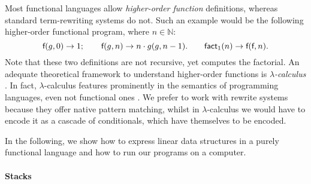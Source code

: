 Most functional languages allow \emph{higher-order
  function}
definitions, whereas standard term\hyp{}rewriting systems do not. Such
an example would be the following higher\hyp{}order functional
program, where \(n \in \mathbb{N}\):
\begin{equation*}
\textsf{f}(g,0) \rightarrow 1;
\qquad
\textsf{f}(g,n) \rightarrow n \cdot g(g,n-1).
\qquad
\textsf{fact}_1(n) \rightarrow \textsf{f}(\textsf{f},n).
\end{equation*}
Note that these two definitions are not recursive, yet
 computes the
factorial. An adequate theoretical
framework to understand higher\hyp{}order functions is
\emph{\(\lambda\)-calculus}\hspace*{-2.1pt}
\citep{HindleySeldin_2008,VanLeeuwen_1990b}.
 In fact,
\(\lambda\)-calculus features prominently in the semantics of
programming languages, even not functional ones
\citep{Winskel_1993,Reynolds_1998,Pierce_2002,FriedmanWand_2008,TurbakGifford_2008}. We
prefer to work with rewrite systems because they offer native pattern
matching, whilst in
\(\lambda\)-calculus we
would have to encode it as a cascade of conditionals, which have
themselves to be encoded.

In the following, we show how to express linear data structures in a
purely functional language and how to run our programs on a computer.

\paragraph{Stacks}
\label{par:stacks}

